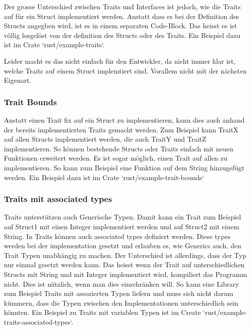 \documentclass[letterpaper,12pt]{article}
\begin{document}
    Der grosse Unterschied zwischen Traits und Interfaces ist jedoch, wie die Traits auf für ein Struct implementiert werden.
    Anstatt dass es bei der Definition des Structs angegben wird, ist es in einem separaten Code-Block.
    Das heisst es ist völlig losgelöst von der definition des Structs oder des Traits.
    Ein Beispiel dazu ist im Crate `rust/example-traits`.

    Leider macht es das nicht einfach für den Entwickler, da nicht immer klar ist, welche Traits auf einem Struct implemtiert sind.
    Vorallem nicht mit der nächsten Eigenart.

    \subsubsection{Trait Bounds}\label{subsubsec:trait-bounds}
    Anstatt einen Trait fix auf ein Struct zu implementieren, kann dies auch anhand der bereits implementierten Traits gemacht werden.
    Zum Beispiel kann TraitX auf allen Structs implementiert werden, die auch TraitY und TraitZ implementieren.
    So können bestehende Structs oder Traits einfach mit neuen Funktionen erweitert werden.
    Es ist sogar möglich, einen Trait auf allen zu implementieren.
    So kann zum Beispiel eine Funktion auf dem String hinzugefügt werden.
    Ein Beispiel dazu ist im Crate `rust/example-trait-bounds`

    \subsubsection{Traits mit associated types}\label{subsubsec:traits-associated-types}
    Traits unterstützen auch Generische Typen.
    Damit kann ein Trait zum Beispiel auf Struct1 mit einen Integer implementiert werden und auf Struct2 mit einem String.
    In Traits können auch associated types definiert werden.
    Diese types werden bei der implementation gesetzt und erlauben es, wie Generics auch, den Trait Typen unabhängig zu machen.
    Der Unterschied ist allerdings, dass der Typ nur einmal gesetzt werden kann.
    Das heisst wenn der Trait auf unterschiedlichen Structs mit String und mit Integer implementiert wird, kompiliert das Programm nicht.
    Dies ist nützlich, wenn man dies einschränken will.
    So kann eine Library zum Beispiel Traits mit assozierten Typen liefern und muss sich nicht darum kümmern,
        dass die Typen zwischen den Implementationen unterschiedlich sein könnten.
    Ein Beispiel zu Traits mit variablen Typen ist im Create `rust/example-traits-associated-types`.
\end{document}
